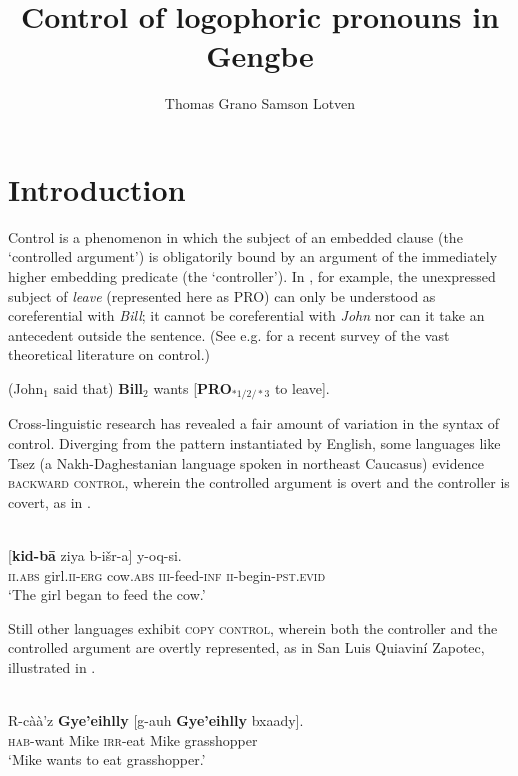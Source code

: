 \documentclass[output=paper,modfonts,nonflat]{langsci/langscibook}
\title{Control of logophoric pronouns in Gengbe}
\author{%
 Thomas Grano\affiliation{Indiana University}\lastand 
 Samson Lotven\affiliation{Indiana University} 
}
\newcommand{\á}{\'{ã}}
\newcommand{\É}{\'{\~{ε}}}
\newcommand{\È}{\`{\~{ε}}}
\newcommand{\í}{\'{\~{i}}}
\newcommand{\ì}{\`{\~{i}}}
\newcommand{\Ó}{\'{\~{ɔ}}}
\newcommand{\Ò}{\`{\~{ɔ}}}
\newcommand{\ú}{\'{ũ}}
\newcommand{\ù}{\`{ũ}}
\begin{document}
\maketitle
\section{Introduction} 
\label{sec:Grano:Introduction:1}

Control is a phenomenon in which the subject of an embedded clause (the `controlled argument') is obligatorily bound by an argument of the immediately higher embedding predicate (the `controller'). In , for example, the unexpressed subject of \emph{leave} (represented here as PRO) can only be understood as coreferential with \emph{Bill}; it cannot be coreferential with \emph{John} nor can it take an antecedent outside the sentence. (See e.g. \citealt{Landau2013} for a recent survey of the vast theoretical literature on control.)

\ea (John$_{1}$ said that) {\textbf{Bill}$_{2}$} wants [{\textbf{PRO}}$_{*1/2/*3}$ to leave]. \label{ex:grano:1}
\z

Cross-linguistic research has revealed a fair amount of variation in the syntax of control. Diverging from the pattern instantiated by English, some languages like Tsez (a Nakh-Daghestanian language spoken in northeast Caucasus) evidence \textsc{backward control}, wherein the controlled argument is overt and the controller is covert, as in .

\ea \label{ex:grano:2}
\\
\gll {\textbf{$\emptyset$}} [\textbf{kid-b\={a}} ziya b-i\v{s}r-a] y-oq-si.\\
\textsc{ii}.\textsc{abs} girl.\textsc{ii}-\textsc{erg} cow.\textsc{abs} \textsc{iii}-feed-\textsc{inf} \textsc{ii}-begin-\textsc{pst}.\textsc{evid}\\
\glt `The girl began to feed the cow.'
\z

Still other languages exhibit \textsc{copy control}, wherein both the controller and the controlled argument are overtly represented, as in San Luis Quiavin\'i Zapotec, illustrated in .

\ea \label{ex:grano:3}
\\
\gll R-c\`a\`a'z \textbf{Gye'eihlly} [g-auh \textbf{Gye'eihlly} bxaady].\\
\textsc{hab}-want Mike \textsc{irr}-eat Mike grasshopper\\
\glt `Mike wants to eat grasshopper.' \\
\z
\end{document}
